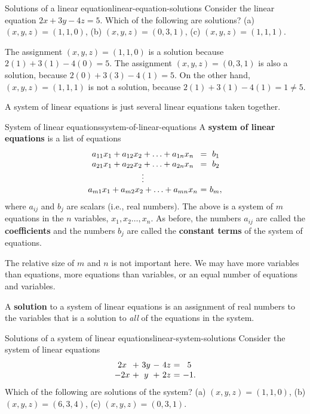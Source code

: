 \begin{example}{Solutions of a linear equation}{linear-equation-solutions}
  Consider the linear equation $2x+3y-4z=5$. Which of the following
  are solutions? (a) $(x,y,z)=(1,1,0)$, (b) $(x,y,z)=(0,3,1)$, (c)
  $(x,y,z)=(1,1,1)$.
\end{example}

\begin{solution}
  The assignment $(x,y,z) = (1,1,0)$ is a solution because
  $2(1)+3(1)-4(0) = 5$. The assignment $(x,y,z) = (0,3,1)$ is also a
  solution, because $2(0) + 3(3) - 4(1) = 5$. On the other hand,
  $(x,y,z) = (1,1,1)$ is not a solution, because
  $2(1) + 3(1)-4(1) = 1 \neq 5$.
\end{solution}

A system of linear equations is just several linear equations taken together.

\begin{definition}{System of linear equations}{system-of-linear-equations}
A \textbf{system of linear equations} is a list of equations
\begin{equation*}
\begin{array}{c@{~}c@{~}c}
a_{11}x_{1}+a_{12}x_{2}+\ldots+a_{1n}x_{n}&=&b_{1} \\
a_{21}x_{1}+a_{22}x_{2}+\ldots+a_{2n}x_{n}&=&b_{2} \\
\vdots \\
a_{m1}x_{1}+a_{m2}x_{2}+\ldots+a_{mn}x_{n}&=&b_{m},
\end{array}
\end{equation*}
where $a_{ij}$ and $b_{j}$ are scalars (i.e., real numbers). The above
is a system of $m$ equations in the $n$ variables,
$x_{1},x_{2}\ldots,x_{n}$.  As before, the numbers $a_{ij}$ are
called the \textbf{coefficients} and the numbers
$b_{j}$ are called the \textbf{constant terms} of
the system of equations.
\end{definition}

The relative size of $m$ and $n$ is not important here. We may have
more variables than equations, more equations than variables, or an
equal number of equations and variables.

A \textbf{solution} to a
system of linear equations is an assignment of real numbers to the
variables that is a solution to {\em all} of the equations in the
system.

\begin{example}{Solutions of a system of linear equations}{linear-system-solutions}
  Consider the system of linear equations
  \begin{equation*}
    \begin{array}{c@{~}c@{~}c@{~}c@{~}c@{~}c@{~}c}
      2x&+&3y&-&4z &=& 5\\
      -2x&+&y&+&2z &=& -1.
    \end{array}
  \end{equation*}
  Which of the following are solutions of the system? (a)
  $(x,y,z)=(1,1,0)$, (b) $(x,y,z)=(6,3,4)$, (c) $(x,y,z)=(0,3,1)$.
\end{example}

